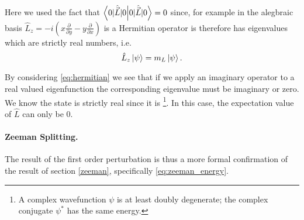 Here we used the fact that $\braket{0 | \hat{\vec{L}} | 0} = 0$ since, for example in the alegbraic basis $\hat{L}_z = -i\left(x \frac{\partial}{\partial y} - y \frac{\partial }{\partial x}\right)$ is a Hermitian operator is therefore has eigenvalues which are strictly real numbers, i.e. 
\begin{equation}
    \hat{L}_z \ket{\psi} = m_L \ket{\psi}.
    \label{eq:hermitian}
\end{equation}

By considering \eqref{eq:hermitian} we see that if we apply an imaginary operator to a real valued eigenfunction the corresponding eigenvalue must be imaginary or zero. We know the state is strictly real since it is \footnote{A complex wavefunction $\psi$ is at least doubly degenerate; the complex conjugate $\psi^*$ has the same energy.}. In this case, the expectation value of $\hat{L}$ can only be $0$. 

\paragraph{Zeeman Splitting.}
The result of the first order perturbation is thus a more formal confirmation of the result of section \ref{zeeman}, specifically \eqref{eq:zeeman_energy}.  

%
